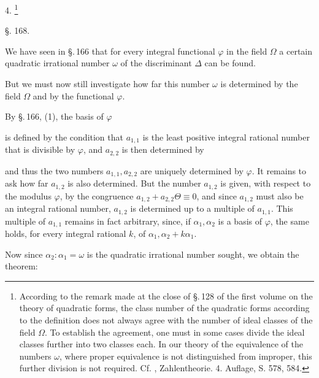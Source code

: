 
4. \footnote{According to the remark made at the close of \S.\,128 of the first volume on the  theory of quadratic forms, the class number of the quadratic forms according to the  definition does not always agree with the number of ideal classes of the field $\Omega$. To establish the agreement, one must in some cases divide the ideal classes further into two classes each. In our theory of the equivalence of the numbers $\omega$, where proper equivalence is not distinguished from improper, this further division is not required. Cf. , Zahlentheorie. 4. Auflage, S. 578, 584.}

\begin{center}
§. 168.

\end{center}

We have seen in \S.\,166 that for every integral functional $\varphi$ in the field $\Omega$ a certain quadratic irrational number $\omega$ of the discriminant $\varDelta$ can be found.

But we must now still investigate how far this number $\omega$ is determined by the field $\Omega$ and by the functional $\varphi$.

By \S.\,166, (1), the basis of $\varphi$


is defined by the condition that $a_{1,1}$ is the least positive integral rational number that is divisible by $\varphi$, and $a_{2,2}$ is then determined by


and thus the two numbers $a_{1,1},a_{2,2}$ are uniquely determined by $\varphi$. It remains to ask how far $a_{1,2}$ is also determined. But the number $a_{1,2}$ is given, with respect to the modulus $\varphi$, by the congruence $a_{1,2}+a_{2,2}\Theta\equiv 0$, and since $a_{1,2}$ must also be an integral rational number, $a_{1,2}$ is determined up to a multiple of $a_{1,1}$. This multiple of $a_{1,1}$ remains in fact arbitrary, since, if $\alpha_1,\alpha_2$ is a basis of $\varphi$, the same holds, for every integral rational $k$, of $\alpha_1,\alpha_2+k\alpha_1$.

Now since $\alpha_2:\alpha_1=\omega$ is the quadratic irrational number sought, we obtain the theorem:
